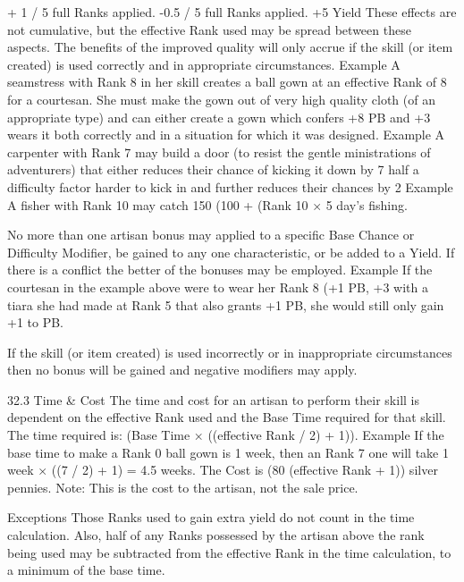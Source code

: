 \documentclass[a4paper]{article}
\begin{document}
\begin{multicols}{3}
+ 1 / 5 full Ranks
applied.
-0.5 / 5 full Ranks
applied.
+5%
Yield
These effects are not cumulative, but the effective
Rank used may be spread between these aspects.
The benefits of the improved quality will only
accrue if the skill (or item created) is used correctly
and in appropriate circumstances.
Example
A seamstress with Rank 8 in her skill
creates a ball gown at an effective Rank of 8 for a courtesan. She must make the gown out of very high quality
cloth (of an appropriate type) and can either create a gown
which confers +8%
PB and +3%
wears it both correctly and in a situation for which it was
designed.
Example
A carpenter with Rank 7 may build a door
(to resist the gentle ministrations of adventurers) that
either reduces their chance of kicking it down by 7%
half a difficulty factor harder to kick in and further reduces
their chances by 2%
Example
A fisher with Rank 10 may catch 150%
(100 + (Rank 10 × 5%
day’s fishing.

No more than one artisan bonus may applied to a
specific Base Chance or Difficulty Modifier, be
gained to any one characteristic, or be added to a
Yield. If there is a conflict the better of the bonuses
may be employed.
Example
If the courtesan in the example above were
to wear her Rank 8 (+1 PB, +3%
with a tiara she had made at Rank 5 that also grants +1 PB,
she would still only gain +1 to PB.

If the skill (or item created) is used incorrectly or
in inappropriate circumstances then no bonus will
be gained and negative modifiers may apply.

32.3 Time & Cost
The time and cost for an artisan to perform their
skill is dependent on the effective Rank used and
the Base Time required for that skill.
The time required is: (Base Time × ((effective
Rank / 2) + 1)).
Example
If the base time to make a Rank 0 ball
gown is 1 week, then an Rank 7 one will take 1 week × ((7
/ 2) + 1) = 4.5 weeks. The Cost is (80%
(effective Rank + 1)) silver pennies. Note: This is the cost
to the artisan, not the sale price.

Exceptions
Those Ranks used to gain extra yield do not count
in the time calculation. Also, half of any Ranks
possessed by the artisan above the rank being used
may be subtracted from the effective Rank in the
time calculation, to a minimum of the base time.


\end{multicols}
\end{document}
